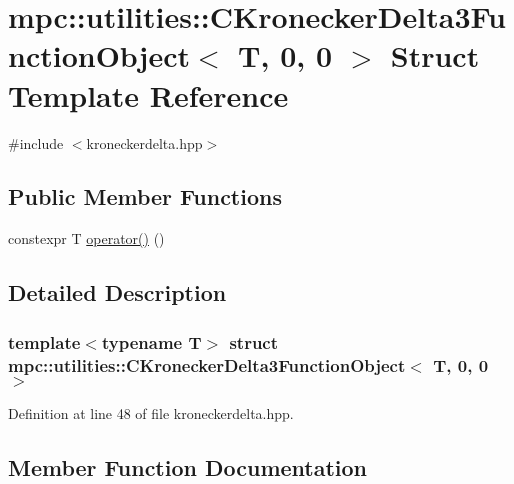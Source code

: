 \hypertarget{structmpc_1_1utilities_1_1_c_kronecker_delta3_function_object_3_01_t_00_010_00_010_01_4}{}\section{mpc\+:\+:utilities\+:\+:C\+Kronecker\+Delta3\+Function\+Object$<$ T, 0, 0 $>$ Struct Template Reference}
\label{structmpc_1_1utilities_1_1_c_kronecker_delta3_function_object_3_01_t_00_010_00_010_01_4}


{\ttfamily \#include $<$kroneckerdelta.\+hpp$>$}

\subsection*{Public Member Functions}
\begin{DoxyCompactItemize}
\item 
constexpr T \mbox{\hyperlink{structmpc_1_1utilities_1_1_c_kronecker_delta3_function_object_3_01_t_00_010_00_010_01_4_aa6e36546027316c59e53c7c0760460da}{operator()}} ()
\end{DoxyCompactItemize}


\subsection{Detailed Description}
\subsubsection*{template$<$typename T$>$\newline
struct mpc\+::utilities\+::\+C\+Kronecker\+Delta3\+Function\+Object$<$ T, 0, 0 $>$}



Definition at line 48 of file kroneckerdelta.\+hpp.



\subsection{Member Function Documentation}
\mbox{\label{structmpc_1_1utilities_1_1_c_kronecker_delta3_function_object_3_01_t_00_010_00_010_01_4_aa6e36546027316c59e53c7c0760460da}} 
